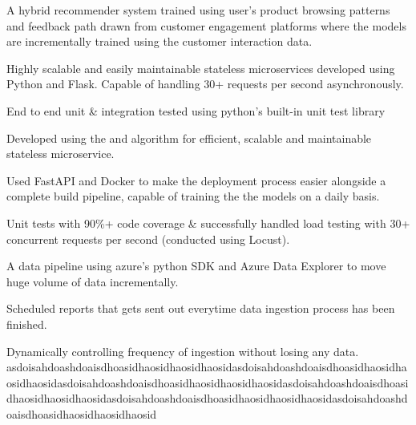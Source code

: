 \vspace{\topsep}


 \textbullet{}  \textbullet{}  \textbullet{}  

\begin{tightemize}
\item A hybrid recommender system trained using user's product browsing patterns and feedback path drawn from customer engagement platforms where the models are incrementally trained using the customer interaction data.
\item Highly scalable and easily maintainable stateless microservices developed using Python and Flask. Capable of handling 30+ requests per second asynchronously.
\item End to end unit \& integration tested using python's built-in unit test library
\end{tightemize}


 \textbullet{}  \textbullet{}  \textbullet{}  \textbullet{} 

\begin{tightemize}
\item Developed using the  and  algorithm for efficient, scalable and maintainable stateless microservice.
\item Used FastAPI and Docker to make the deployment process easier alongside a complete build pipeline, capable of training the the models on a daily basis.
\item Unit tests with 90\%+ code coverage \& successfully handled load testing with 30+ concurrent requests per second (conducted using Locust).
\end{tightemize}


 \textbullet{}  \textbullet{} 

\begin{tightemize}
\item A data pipeline using azure's python SDK and Azure Data Explorer to move huge volume of data incrementally.
\item Scheduled reports that gets sent out everytime data ingestion process has been finished.
\item Dynamically controlling frequency of ingestion without losing any data. asdoisahdoashdoaisdhoasidhaosidhaosidhaosidasdoisahdoashdoaisdhoasidhaosidhaosidhaosidasdoisahdoashdoaisdhoasidhaosidhaosidhaosidasdoisahdoashdoaisdhoasidhaosidhaosidhaosidasdoisahdoashdoaisdhoasidhaosidhaosidhaosidasdoisahdoashdoaisdhoasidhaosidhaosidhaosid
\end{tightemize}